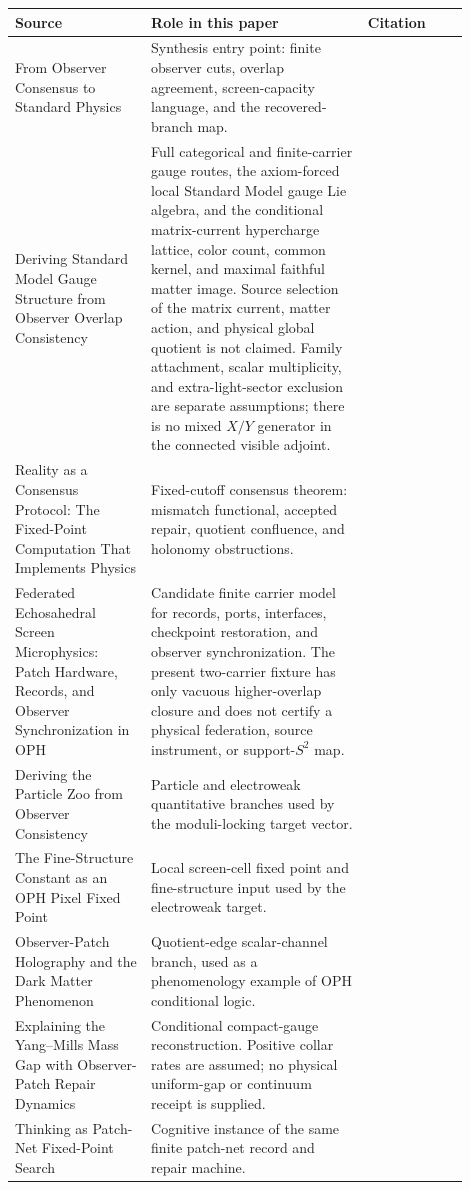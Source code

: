 \documentclass[11pt]{article}
\theoremstyle{remark}
\theoremstyle{plain}
\begin{document}
\begin{longtable}{L{0.27\linewidth}L{0.43\linewidth}L{0.20\linewidth}}
\toprule
\textbf{Source} & \textbf{Role in this paper} & \textbf{Citation} \\
\midrule
From Observer Consensus to Standard Physics & Synthesis entry point: finite observer cuts, overlap agreement,
screen-capacity language, and the recovered-branch map. &
\cite{OPHObserversAllYouNeed} \\
Deriving Standard Model Gauge Structure from Observer Overlap Consistency & Full categorical
and finite-carrier gauge routes, the axiom-forced local Standard Model gauge Lie algebra, and the
conditional matrix-current hypercharge lattice, color count, common kernel,
and maximal faithful matter image. Source selection of the matrix current,
matter action, and physical global quotient is not claimed. Family attachment, scalar multiplicity, and
extra-light-sector exclusion are separate assumptions;
there is no mixed \(X/Y\) generator in the connected visible adjoint. &
\cite{OPHGaugeCore} \\
Reality as a Consensus Protocol: The Fixed-Point Computation That Implements Physics & Fixed-cutoff consensus theorem: mismatch functional, accepted
repair, quotient confluence, and holonomy obstructions. &
\cite{OPHRealityConsensus} \\
Federated Echosahedral Screen Microphysics: Patch Hardware, Records, and Observer Synchronization in OPH & Candidate finite carrier model for records, ports,
interfaces, checkpoint restoration, and observer synchronization. The present two-carrier
fixture has only vacuous higher-overlap closure and does not certify a physical federation,
source instrument, or support-\(S^2\) map. &
\cite{OPHScreenMicrophysics} \\
Deriving the Particle Zoo from Observer Consistency & Particle and electroweak quantitative branches used by the
moduli-locking target vector. &
\cite{OPHParticleZoo} \\
The Fine-Structure Constant as an OPH Pixel Fixed Point & Local screen-cell fixed point and
fine-structure input used by the electroweak target. &
\cite{OPHFineStructure} \\
Observer-Patch Holography and the Dark Matter Phenomenon & Quotient-edge scalar-channel branch,
used as a phenomenology example of OPH conditional logic. &
\cite{OPHDarkMatter} \\
Explaining the Yang--Mills Mass Gap with Observer-Patch Repair Dynamics & Conditional compact-gauge reconstruction. Positive collar rates are assumed; no physical uniform-gap or continuum receipt is supplied. &
\cite{OPHYangMillsGap} \\
Thinking as Patch-Net Fixed-Point Search & Cognitive instance of the same finite patch-net
record and repair machine. &
\cite{OPHThinkingPatchNet} \\
\bottomrule
\end{longtable}
\end{document}
